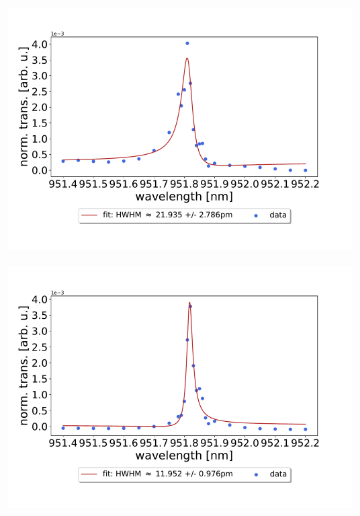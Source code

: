 \begin{figure}[h!]
    \centering
    \begin{subfigure}[b]{0.49\textwidth}
        \centering
        \includegraphics[width=\textwidth]{figures/results/60um_M5_fit_1.pdf}
        \caption{}
        \label{fig:short_single_fano_trans}
    \end{subfigure}
    \begin{subfigure}[b]{0.49\textwidth}
        \centering
        \includegraphics[width=\textwidth]{figures/results/220um_M5_fit_4.pdf}
        \caption{}
        \label{fig:long_single_fano_trans}
    \end{subfigure}
\end{figure}

